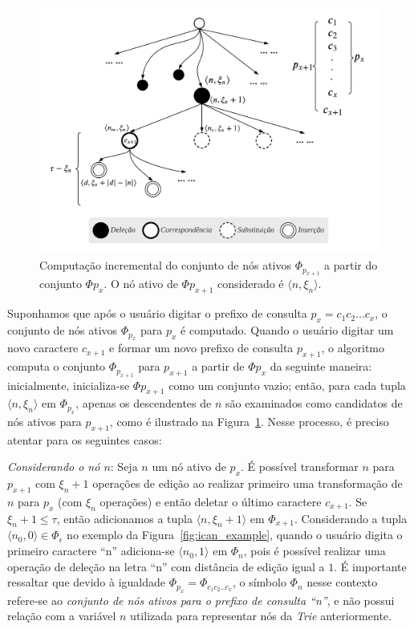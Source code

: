 \begin{figure}[ht]
    \centering
    \includegraphics[width=1\textwidth]{figures/incrementally_computing_active_node_set.png}
    \caption{Computação incremental do conjunto de nós ativos $\Phi_{p_{x+1}}$ a partir do conjunto $\Phi{p_{x}}.$ O nó ativo de $\Phi{p_{x+1}}$ considerado é $\langle n, \xi_{n} \rangle$.}
    \label{fig:incrementally_computing_active_node_set}
\end{figure}

Suponhamos que após o usuário digitar o prefixo de consulta $p_{x} = c_{1}c_{2}...c_{x}$, o conjunto de nós ativos $\Phi_{p_{x}}$ para $p_{x}$ é computado. Quando o usuário digitar um novo caractere $c_{x+1}$ e formar um novo prefixo de consulta $p_{x+1}$, o algoritmo computa o conjunto $\Phi_{p_{x+1}}$ para $p_{x+1}$ a partir de $\Phi{p_{x}}$ da seguinte maneira: inicialmente, inicializa-se $\Phi{p_{x+1}}$ como um conjunto vazio; então, para cada tupla $\langle n, \xi_{n} \rangle$ em $\Phi_{p_{x}}$, apenas os descendentes de $n$ são examinados como candidatos de nós ativos para $p_{x+1}$, como é ilustrado na Figura~\ref{fig:incrementally_computing_active_node_set}. Nesse processo, é preciso atentar para os seguintes casos:

\textit{Considerando o nó $n$}: Seja $n$ um nó ativo de $p_{x}$. É possível transformar $n$ para $p_{x+1}$ com $\xi_{n} + 1$ operações de edição ao realizar primeiro uma transformação de $n$ para $p_{x}$ (com $\xi_{n}$ operações) e então deletar o último caractere $c_{x+1}$. Se $\xi_{n} + 1 \leq \tau$, então adicionamos a tupla $\langle n, \xi_{n} + 1 \rangle$ em $\Phi_{x + 1}$. Considerando a tupla $\langle n_{0}, 0 \rangle \in \Phi_{\epsilon}$ no exemplo da Figura~\ref{fig:ican_example}, quando o usuário digita o primeiro caractere ``n'' adiciona-se $\langle n_{0}, 1 \rangle$ em $\Phi_{n}$, pois é possível realizar uma operação de deleção na letra ``n'' com distância de edição igual a $1$. É importante ressaltar que devido à igualdade $\Phi_{p_{x}} = \Phi_{c_{1}c_{2}..c_{x}}$, o símbolo $\Phi_{n}$ nesse contexto refere-se ao \textit{conjunto de nós ativos para o prefixo de consulta ``n''}, e não possui relação com a variável $n$ utilizada para representar nós da \textit{Trie} anteriormente.

